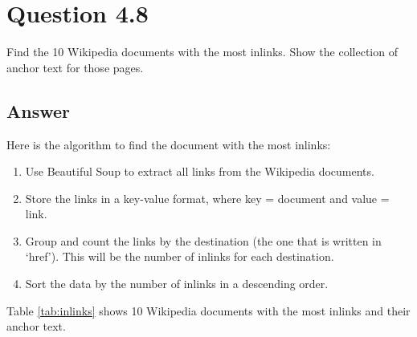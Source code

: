 \documentclass[letterpaper,11pt]{article}
\begin{document}
\noindent\makebox[\linewidth]{\rule{\textwidth}{0.4pt}}

\section*{Question 4.8}
\begin{spverbatim}
Find the 10 Wikipedia documents with the most inlinks. Show the collection of anchor text for those pages.
\end{spverbatim}

\subsection*{Answer}
Here is the algorithm to find the document with the most inlinks:
\begin{enumerate}
\item Use Beautiful Soup \cite{bs4} to extract all links from the Wikipedia documents.
\item Store the links in a key-value format, where key = document and value = link. 
\item Group and count the links by the destination (the one that is written in `href'). This will be the number of inlinks for each destination. 
\item Sort the data by the number of inlinks in a descending order.  
\end{enumerate}

Table \ref{tab:inlinks} shows 10 Wikipedia documents with the most inlinks and their anchor text. 
\end{document}
